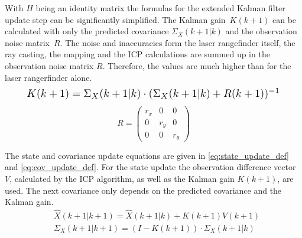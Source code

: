 With $H$ being an identity matrix the formulas for the extended Kalman filter update step can be significantly simplified. The Kalman \mbox{gain $K(k+1)$} can be calculated with only the predicted covariance $\Sigma_{X}(k+1|k)$ and the observation noise \mbox{matrix $R$}. The noise and inaccuracies form the laser rangefinder itself, the ray casting, the mapping and the ICP calculations are summed up in the observation noise matrix $R$. Therefore, the values are much higher than for the laser rangerfinder alone.
\begin{equation}\label{eq:Kalman_def}
    \resizebox{0.89\hsize}{!}{%
        $K(k+1)= \Sigma_{X}(k+1|k)\cdot {(\Sigma_{X}(k+1|k) + R(k+1)})^{-1} $%
        }
\end{equation}
\begin{equation}
R= \begin{pmatrix} r_{x} & 0 & 0 \\ 0 & r_{y} & 0 \\ 0 & 0 & r_{\theta}\end{pmatrix}\label{R_def}
\end{equation}

The state and covariance update equations are given in \eqref{eq:state_update_def} and \eqref{eq:cov_update_def}. For the state update the observation difference vector $V$, calculated by the ICP algorithm, as well as the Kalman gain $K(k+1)$, are used. The next covariance only depends on the predicted covariance and the Kalman gain.
\begin{align}
& \hat{X}(k+1|k+1) = \hat{X}(k+1|k) + K(k+1)V(k+1) \label{eq:state_update_def} \\
& \Sigma_{X}(k+1|k+1) = (I-K(k+1))\cdot\Sigma_{X}(k+1|k) \label{eq:cov_update_def}
\end{align}


